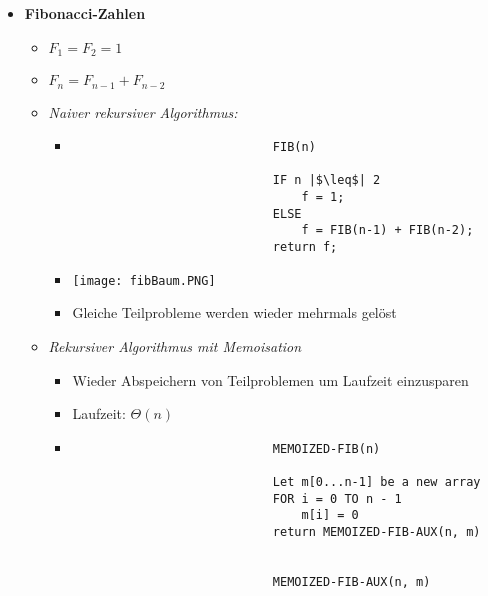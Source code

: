 \begin{itemize}
        \item \textbf{Fibonacci-Zahlen}
            \begin{itemize}
                \item $F_1 = F_2 = 1$
                \item $F_n = F_{n-1} + F_{n-2}$
                \item \textit{Naiver rekursiver Algorithmus:}
                    \begin{itemize}
                        \item[]
                            \begin{verbatim}
                            FIB(n)
                            
                            IF n |$\leq$| 2
                                f = 1;
                            ELSE
                                f = FIB(n-1) + FIB(n-2);
                            return f;
                            \end{verbatim}
                            \item[] \texttt{[image: fibBaum.PNG]}
                            \item[] Gleiche Teilprobleme werden wieder mehrmals gelöst  
                    \end{itemize}
                \item \textit{Rekursiver Algorithmus mit Memoisation}
                    \begin{itemize}
                        \item Wieder Abspeichern von Teilproblemen um Laufzeit einzusparen
                        \item Laufzeit: $\Theta(n)$
                        \item[]
                            \begin{verbatim}
                            MEMOIZED-FIB(n)

                            Let m[0...n-1] be a new array
                            FOR i = 0 TO n - 1
                                m[i] = 0
                            return MEMOIZED-FIB-AUX(n, m)


                            MEMOIZED-FIB-AUX(n, m)


\end{verbatim}
\end{itemize}
\end{itemize}
\end{itemize}
